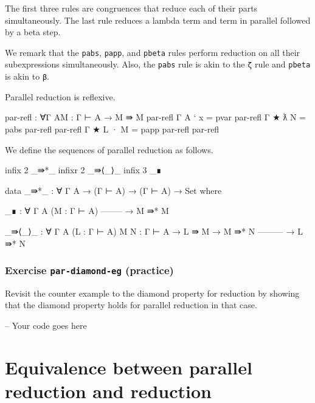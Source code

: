 The first three rules are congruences that reduce each of their parts
simultaneously. The last rule reduces a lambda term and term in parallel
followed by a beta step.

We remark that the \texttt{pabs}, \texttt{papp}, and \texttt{pbeta}
rules perform reduction on all their subexpressions simultaneously.
Also, the \texttt{pabs} rule is akin to the \texttt{ζ} rule and
\texttt{pbeta} is akin to \texttt{β}.

Parallel reduction is reflexive.

\begin{fence}
\begin{code}
par-refl : ∀{Γ A}{M : Γ ⊢ A} → M ⇛ M
par-refl {Γ} {A} {` x} = pvar
par-refl {Γ} {★} {ƛ N} = pabs par-refl
par-refl {Γ} {★} {L · M} = papp par-refl par-refl
\end{code}
\end{fence}

We define the sequences of parallel reduction as follows.

\begin{fence}
\begin{code}
infix  2 _⇛*_
infixr 2 _⇛⟨_⟩_
infix  3 _∎

data _⇛*_ : ∀ {Γ A} → (Γ ⊢ A) → (Γ ⊢ A) → Set where

  _∎ : ∀ {Γ A} (M : Γ ⊢ A)
      --------
    → M ⇛* M

  _⇛⟨_⟩_ : ∀ {Γ A} (L : Γ ⊢ A) {M N : Γ ⊢ A}
    → L ⇛ M
    → M ⇛* N
      ---------
    → L ⇛* N
\end{code}
\end{fence}

\hypertarget{exercise-par-diamond-eg-practice}{%
\subsubsection{\texorpdfstring{Exercise \texttt{par-diamond-eg}
(practice)}{Exercise par-diamond-eg (practice)}}\label{exercise-par-diamond-eg-practice}}

Revisit the counter example to the diamond property for reduction by
showing that the diamond property holds for parallel reduction in that
case.

\begin{fence}
\begin{code}
-- Your code goes here
\end{code}
\end{fence}

\hypertarget{equivalence-between-parallel-reduction-and-reduction}{%
\section{Equivalence between parallel reduction and
reduction}\label{equivalence-between-parallel-reduction-and-reduction}}


